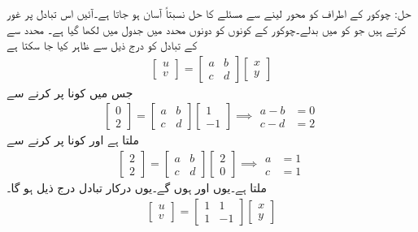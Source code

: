 حل: چوکور  کے اطراف کو  محور  لینے سے مسئلے کا حل نسبتاً آسان ہو جاتا ہے۔آئیں اس تبادل پر غور کرتے ہیں جو  کو  میں بدلے۔چوکور کے کونوں کو دونوں محدد میں جدول  میں لکھا گیا ہے۔  محدد سے  کے تبادل کو درج ذیل سے ظاہر کیا جا سکتا ہے
\begin{align*}
\begin{bmatrix}
u\\v
\end{bmatrix}=
\begin{bmatrix}
a&b\\
c&d
\end{bmatrix}
\begin{bmatrix}
x\\
y
\end{bmatrix}
\end{align*}
جس میں کونا  پر کرنے سے
\begin{gather*}
\begin{bmatrix}
0\\2
\end{bmatrix}=
\begin{bmatrix}
a&b\\
c&d
\end{bmatrix}
\begin{bmatrix}
1\\
-1
\end{bmatrix}
\implies
\begin{aligned}
a-b&=0\\
c-d&=2
\end{aligned}
\end{gather*}
ملتا ہے اور کونا  پر کرنے سے
\begin{gather*}
\begin{bmatrix}
2\\2
\end{bmatrix}=
\begin{bmatrix}
a&b\\
c&d
\end{bmatrix}
\begin{bmatrix}
2\\
0
\end{bmatrix}
\implies
\begin{aligned}
a&=1\\
c&=1
\end{aligned}
\end{gather*}
ملتا ہے۔یوں  اور  ہوں گے۔یوں درکار تبادل درج ذیل ہو گا۔
\begin{align*}
\begin{bmatrix}
u\\v
\end{bmatrix}=
\begin{bmatrix}
1&1\\
1&-1
\end{bmatrix}
\begin{bmatrix}
x\\
y
\end{bmatrix}
\end{align*}

